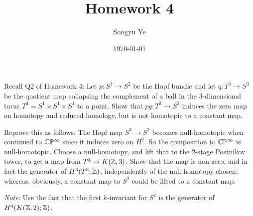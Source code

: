 \documentclass[12pt]{article}
\title{Homework 4}
\author{Songyu Ye}
\date{\today}
\begin{document}
\psettitle

\begin{problem}[1]
Recall Q2 of Homework 4:
Let $p:S^3\to S^2$ be the Hopf bundle and let $q:T^3\to S^3$ be the quotient map collapsing the complement of a ball in the $3$-dimensional torus $T^3=S^1\times S^1\times S^1$ to a point. Show that $pq:T^3\to S^2$ induces the zero map on homotopy and reduced homology, but is not homotopic to a constant map.

Reprove this as follows. The Hopf map $S^3\to S^2$ becomes null-homotopic when continued to $\mathbb{C}\mathbb{P}^\infty$ since it induces zero on $H^2$. So the composition to $\mathbb{C}\mathbb{P}^\infty$ is null-homotopic. Choose a null-homotopy, and lift that to the $2$-stage Postnikov tower, to get a map from $T^3\to K(\mathbb{Z},3)$. Show that the map is non-zero, and in fact the generator of $H^3(T^3;\mathbb{Z})$, independently of the null-homotopy chosen; whereas, obviously, a constant map to $S^2$ could be lifted to a constant map.

\emph{Note:} Use the fact that the first $k$-invariant for $S^2$ is the generator of $H^4(K(\mathbb{Z},2);\mathbb{Z})$.
\end{problem}
\end{document}
